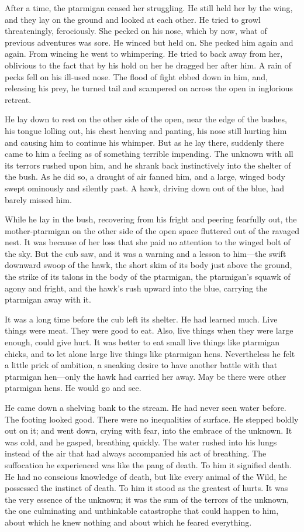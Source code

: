 \documentclass[10pt]{book}
\begin{document}
After a time, the ptarmigan ceased her struggling. He still held her by
the wing, and they lay on the ground and looked at each other. He tried
to growl threateningly, ferociously. She pecked on his nose, which by
now, what of previous adventures was sore. He winced but held on. She
pecked him again and again. From wincing he went to whimpering. He
tried to back away from her, oblivious to the fact that by his hold on
her he dragged her after him. A rain of pecks fell on his ill-used
nose. The flood of fight ebbed down in him, and, releasing his prey, he
turned tail and scampered on across the open in inglorious retreat.

He lay down to rest on the other side of the open, near the edge of the
bushes, his tongue lolling out, his chest heaving and panting, his nose
still hurting him and causing him to continue his whimper. But as he
lay there, suddenly there came to him a feeling as of something
terrible impending. The unknown with all its terrors rushed upon him,
and he shrank back instinctively into the shelter of the bush. As he
did so, a draught of air fanned him, and a large, winged body swept
ominously and silently past. A hawk, driving down out of the blue, had
barely missed him.

While he lay in the bush, recovering from his fright and peering
fearfully out, the mother-ptarmigan on the other side of the open space
fluttered out of the ravaged nest. It was because of her loss that she
paid no attention to the winged bolt of the sky. But the cub saw, and
it was a warning and a lesson to him—the swift downward swoop of the
hawk, the short skim of its body just above the ground, the strike of
its talons in the body of the ptarmigan, the ptarmigan’s squawk of
agony and fright, and the hawk’s rush upward into the blue, carrying
the ptarmigan away with it.

It was a long time before the cub left its shelter. He had learned
much. Live things were meat. They were good to eat. Also, live things
when they were large enough, could give hurt. It was better to eat
small live things like ptarmigan chicks, and to let alone large live
things like ptarmigan hens. Nevertheless he felt a little prick of
ambition, a sneaking desire to have another battle with that ptarmigan
hen—only the hawk had carried her away. May be there were other
ptarmigan hens. He would go and see.

He came down a shelving bank to the stream. He had never seen water
before. The footing looked good. There were no inequalities of surface.
He stepped boldly out on it; and went down, crying with fear, into the
embrace of the unknown. It was cold, and he gasped, breathing quickly.
The water rushed into his lungs instead of the air that had always
accompanied his act of breathing. The suffocation he experienced was
like the pang of death. To him it signified death. He had no conscious
knowledge of death, but like every animal of the Wild, he possessed the
instinct of death. To him it stood as the greatest of hurts. It was the
very essence of the unknown; it was the sum of the terrors of the
unknown, the one culminating and unthinkable catastrophe that could
happen to him, about which he knew nothing and about which he feared
everything.
\end{document}
